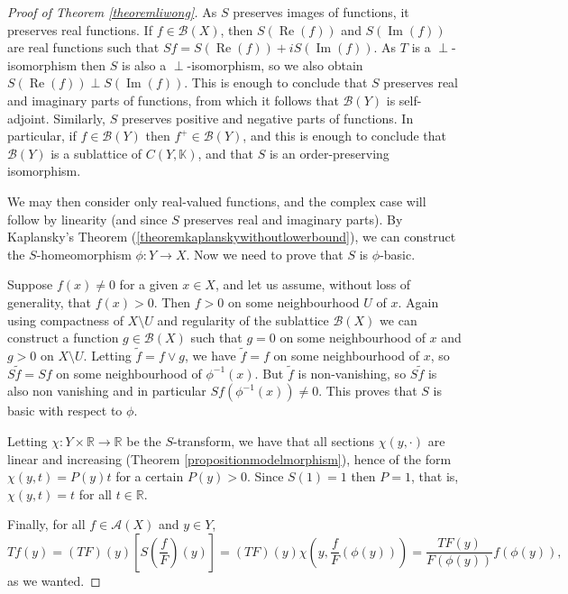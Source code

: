 \documentclass[letter,11pt]{amsart}
\theoremstyle{plain}		\newtheorem{theorem}[generalnumbering]{Theorem}
\theoremstyle{plain}		\newtheorem{corollary}[generalnumbering]{Corollary}
\theoremstyle{definition}		\newtheorem{definition}[generalnumbering]{Definition}
\theoremstyle{definition}		\newtheorem{example}[generalnumbering]{Example}
\theoremstyle{plain}		\newtheorem{proposition}[generalnumbering]{Proposition}
\theoremstyle{plain}		\newtheorem{lemma}[generalnumbering]{Lemma}
\theoremstyle{plain}    \newtheorem{plainstyle}[generalnumbering]{\namefordifferentenvironment}
\theoremstyle{plain}    \newtheorem*{plainstyle*}{\namefordifferentenvironment}
\theoremstyle{definition}    \newtheorem{definitionstyle}[generalnumbering]{\namefordifferentenvironment}
\theoremstyle{definition}    \newtheorem*{definitionstyle*}{\namefordifferentenvironment}
\begin{document}
\begin{proof}[Proof of Theorem \ref{theoremliwong}]
	As $S$ preserves images of functions, it preserves real functions. If $f\in\mathcal{B}(X)$, then $S(\operatorname{Re}(f))$ and $S(\operatorname{Im}(f))$ are real functions such that $Sf=S(\operatorname{Re}(f))+iS(\operatorname{Im}(f))$. As $T$ is a $\perp$-isomorphism then $S$ is also a $\perp$-isomorphism, so we also obtain $S(\operatorname{Re}(f))\perp S(\operatorname{Im}(f))$. This is enough to conclude that $S$ preserves real and imaginary parts of functions, from which it follows that $\mathcal{B}(Y)$ is self-adjoint. Similarly, $S$ preserves positive and negative parts of functions. In particular, if $f\in\mathcal{B}(Y)$ then $f^+\in\mathcal{B}(Y)$, and this is enough to conclude that $\mathcal{B}(Y)$ is a sublattice of $C(Y,\mathbb{K})$, and that $S$ is an order-preserving isomorphism.
	
	We may then consider only real-valued functions, and the complex case will follow by linearity (and since $S$ preserves real and imaginary parts). By Kaplansky's Theorem (\ref{theoremkaplanskywithoutlowerbound}), we can construct the $S$-homeomorphism $\phi\colon Y\to X$. Now we need to prove that $S$ is $\phi$-basic.
	
	Suppose $f(x)\neq 0$ for a given $x\in X$, and let us assume, without loss of generality, that $f(x)>0$. Then $f>0$ on some neighbourhood $U$ of $x$. Again using compactness of $X\setminus U$ and regularity of the sublattice $\mathcal{B}(X)$ we can construct a function $g\in\mathcal{B}(X)$ such that $g=0$ on some neighbourhood of $x$ and $g>0$ on $X\setminus U$. Letting $\widetilde{f}=f\lor g$, we have $\widetilde{f}=f$ on some neighbourhood of $x$, so $S\widetilde{f}=Sf$ on some neighbourhood of $\phi^{-1}(x)$. But $\widetilde{f}$ is non-vanishing, so $S\widetilde{f}$ is also non vanishing and in particular $Sf(\phi^{-1}(x))\neq 0$. This proves that $S$ is basic with respect to $\phi$.
	
	Letting $\chi\colon Y\times\mathbb{R}\to\mathbb{R}$ be the $S$-transform, we have that all sections $\chi(y,\cdot)$ are linear and increasing (Theorem \ref{propositionmodelmorphism}), hence of the form $\chi(y,t)=P(y)t$ for a certain $P(y)>0$. Since $S(1)=1$ then $P=1$, that is, $\chi(y,t)=t$ for all $t\in\mathbb{R}$.
	
	Finally, for all $f\in\mathcal{A}(X)$ and $y\in Y$,
	\[Tf(y)=(TF)(y)\left[S\left(\frac{f}{F}\right)(y)\right]=(TF)(y)\chi\left(y,\frac{f}{F}(\phi(y))\right)=\frac{TF(y)}{F(\phi(y))}f(\phi(y)),\]
	as we wanted.
\end{proof}
\end{document}
